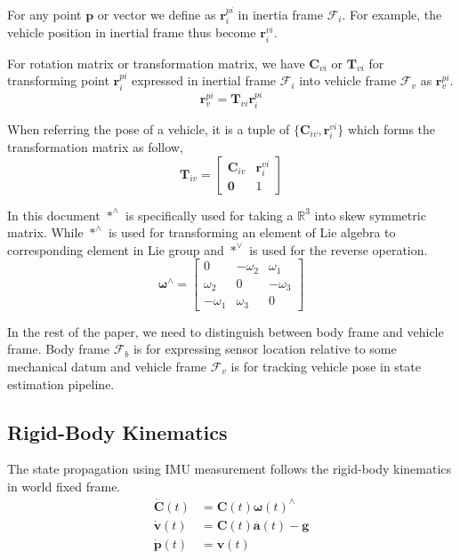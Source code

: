 \documentclass[conference]{IEEEtran}
\begin{document}
For any point $\textbf{p}$ or vector we define as $\textbf{r}_i^{pi}$ in inertia frame $\mathcal{F}_i$. For example, the vehicle position in inertial frame thus become $\textbf{r}_i^{vi}$.

For rotation matrix or transformation matrix, we have $\textbf{C}_{vi}$ or $\textbf{T}_{vi}$ for transforming point $\textbf{r}_i^{pi}$ expressed in inertial frame $\bm{\mathcal{F}}_i$ into vehicle frame $\bm{\mathcal{F}}_v$ as $\textbf{r}_v^{pi}$.
$$
\textbf{r}_v^{pi} = \textbf{T}_{vi} \textbf{r}_i^{pi}
$$

When referring the pose of a vehicle, it is a tuple of $\{\textbf{C}_{iv}, \textbf{r}_i^{vi}\}$ which forms the transformation matrix as follow,
$$
\textbf{T}_{iv} = \left[\begin{matrix}
    \textbf{C}_{iv} & \textbf{r}_i^{vi} \\
    \textbf{0} & 1
\end{matrix}\right]
$$

In this document $*^\wedge$ is specifically used for taking a $\mathbb{R}^3$ into skew symmetric matrix. While $*^\wedge$ is used for transforming an element of Lie algebra to corresponding element in Lie group and $*^\vee$ is used for the reverse operation.
$$
\bm{\omega}^\wedge = \left[\begin{matrix}
    0 & -\omega_2 & \omega_1 \\
    \omega_2 & 0 & -\omega_3 \\
    -\omega_1 & \omega_3 & 0
\end{matrix}\right]
$$

In the rest of the paper, we need to distinguish between body frame and vehicle frame. Body frame $\bm{\mathcal{F}}_b$ is for expressing sensor location relative to some mechanical datum and vehicle frame $\bm{\mathcal{F}}_v$ is for tracking vehicle pose in state estimation pipeline.

\subsection{Rigid-Body Kinematics}

The state propagation using IMU measurement follows the rigid-body kinematics in world fixed frame.
$$
\begin{equation}
\begin{align}
    \dot{\textbf{C}}(t) &= \textbf{C}(t) \bm{\omega}(t)^\wedge \\
    \dot{\textbf{v}}(t) &= \textbf{C}(t) \textbf{a}(t) - \textbf{g} \\
    \dot{\textbf{p}}(t) &= \textbf{v}(t)
\end{align}
\end{equation}
$$
\end{document}
